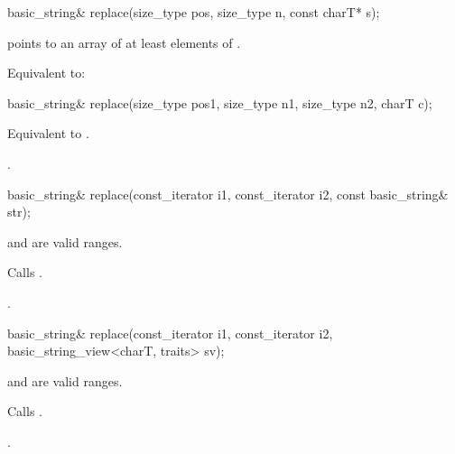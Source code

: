 %
\begin{itemdecl}
basic_string&
  replace(size_type pos, size_type n, const charT* s);
\end{itemdecl}

\begin{itemdescr}
\pnum
\requires {} points to an array of at least
 elements of .

\pnum
\effects Equivalent to: 
\end{itemdescr}

%
\begin{itemdecl}
basic_string&
  replace(size_type pos1, size_type n1,
          size_type n2, charT c);
\end{itemdecl}

\begin{itemdescr}
\pnum
\effects Equivalent to .

\pnum
\returns
{}.
\end{itemdescr}

%
\begin{itemdecl}
basic_string& replace(const_iterator i1, const_iterator i2, const basic_string& str);
\end{itemdecl}

\begin{itemdescr}
\pnum
\requires
{} and  are valid ranges.

\pnum
\effects
Calls .

\pnum
\returns
{}.
\end{itemdescr}

%
\begin{itemdecl}
basic_string& replace(const_iterator i1, const_iterator i2,
                      basic_string_view<charT, traits> sv);
\end{itemdecl}

\begin{itemdescr}
\pnum
\requires
{} and  are valid ranges.

\pnum
\effects
Calls .

\pnum
\returns
{}.
\end{itemdescr}

